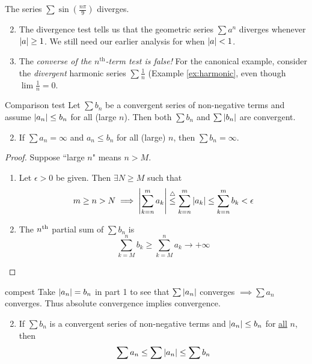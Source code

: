 \begin{examples}{}{}
	\exstart The series $\sum\sin(\frac{n\pi}9)$ diverges.
	\begin{enumerate}\setcounter{enumi}{1} 
	  \item The divergence test tells us that the geometric series $\sum a^n$ diverges whenever $\left| a\right|\ge 1$. We still need our earlier analysis for when $\left| a\right|<1$.
	  \item The \emph{converse of the $n^\text{th}$-term test is false!} For the canonical example, consider the \emph{divergent} harmonic series $\sum \frac 1n$ (Example \ref{ex:harmonic}, even though $\lim\frac 1n=0$.
	\end{enumerate}
\end{examples}


\begin{thm}{Comparison test}{}
\exstart Let $\sum b_n$ be a convergent series of non-negative terms and assume $\left| a_n\right|\le b_n$ for all (large $n$). Then both $\sum b_n$ and $\sum \left| b_n\right|$ are convergent.
	\begin{enumerate}\setcounter{enumi}{1}
	  \item If $\sum a_n=\infty$ and $a_n\le b_n$ for all (large) $n$, then $\sum b_n=\infty$.
	\end{enumerate}
\end{thm}

\begin{proof}
Suppose ``large $n$" means $n>M$. 
	\begin{enumerate}
	  \item Let $\epsilon>0$ be given. Then $\exists N\ge M$ such that
		\[m\ge n>N\implies\left| \sum_{k=n}^ma_k\right|\overset{\triangle}{\le}\sum_{k=n}^m\left| a_k\right|\le\sum_{k=n}^mb_k<\epsilon\]
		\item The $n\textsuperscript{th}$ partial sum of $\sum b_n$ is
		\[\sum_{k=M}^nb_k\ge \sum_{k=M}^na_k\to+\infty\tag*{\qedhere}\]
	\end{enumerate}
\end{proof}

\begin{cor}{}{compest}
	\exstart Take $\left| a_n\right|=b_n$ in part 1 to see that $\sum\left| a_n\right|$ converges $\implies \sum a_n$ converges. Thus absolute convergence implies convergence.
	\begin{enumerate}\setcounter{enumi}{1}
	  \item If $\sum b_n$ is a convergent series of non-negative terms and $\left| a_n\right|\le b_n$ for \underline{all} $n$, then
	  \[\sum a_n\le \sum\left| a_n\right|\le \sum b_n\]
	\end{enumerate}
\end{cor}

